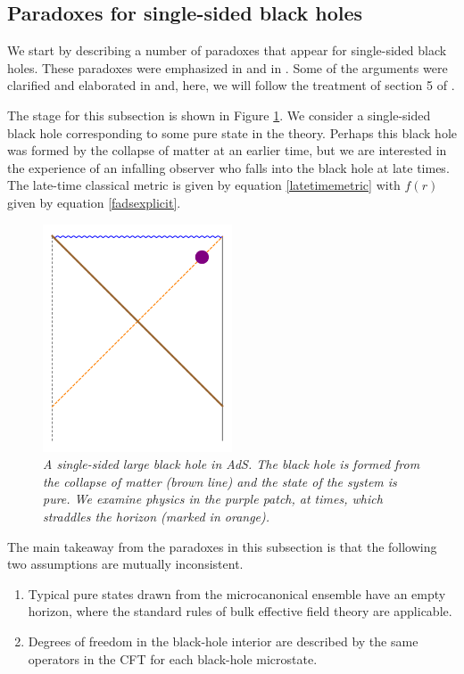 \documentclass[12pt]{article}
\begin{document}
\subsection{Paradoxes for single-sided black holes \label{paradoxsingleside}}
We start by describing a number of paradoxes that appear for single-sided black holes. These paradoxes were emphasized in \cite{Almheiri:2013hfa} and in \cite{Marolf:2013dba}. Some of the arguments were clarified and elaborated in \cite{Papadodimas:2015jra} and, here, we will follow the treatment of section 5 of \cite{Papadodimas:2015jra}. 

The stage for this subsection is shown in Figure \ref{figsingleside}. We consider a single-sided black hole corresponding to some pure state in the theory. Perhaps this black hole was formed by the collapse of matter at an earlier time, but we are interested in the experience of an infalling observer who falls into the black hole at late times. The late-time classical metric is given by equation \eqref{latetimemetric} with $f(r)$ given by equation \eqref{fadsexplicit}.
\begin{figure}[!ht]
\begin{center}
\includegraphics[width=0.5\textwidth]{singleside.pdf}
\caption{\em A single-sided large black hole in AdS. The black hole is formed from the collapse of matter (brown line) and the state of the system is pure. We examine physics in the purple patch, at times, which straddles the horizon (marked in orange).\label{figsingleside}}
\end{center}
\end{figure}

The main takeaway from the paradoxes in this subsection is that the following two assumptions are mutually inconsistent.
\begin{enumerate}
\item\label{assumbig1}
Typical pure states drawn from the microcanonical ensemble have an empty horizon, where the standard rules of bulk effective field theory are applicable.
\item\label{assumbig2}
Degrees of freedom in the black-hole interior are described by the same
operators in the CFT for each black-hole microstate.
\end{enumerate}
\end{document}
